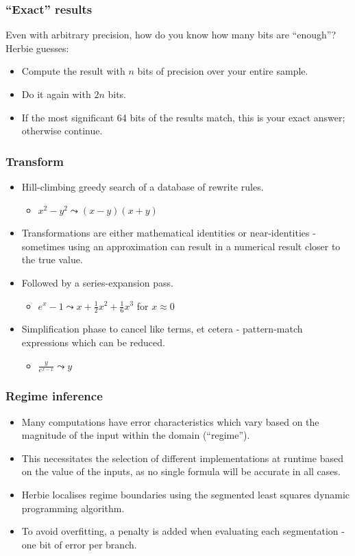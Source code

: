 \documentclass{beamer}
\begin{document}
\begin{frame}
  \frametitle{``Exact'' results}

  Even with arbitrary precision, how do you know how many bits are
  ``enough''? Herbie guesses:

  \begin{itemize}
    \item Compute the result with \(n\) bits of precision over your
      entire sample.
    \item Do it again with \(2n\) bits.
    \item If the most significant 64 bits of the results match, this
      is your exact answer; otherwise continue.
  \end{itemize}
\end{frame}

\begin{frame}
  \frametitle{Transform}
  \begin{itemize}
  \item Hill-climbing greedy search of a database of rewrite rules.
    \begin{itemize}
    \item \(x^2 - y^2 \leadsto (x - y)(x + y)\)
    \end{itemize}
  \item Transformations are either mathematical identities or
    near-identities - sometimes using an approximation can result in a
    numerical result closer to the true value.
  \item Followed by a series-expansion pass.
    \begin{itemize}
      \item \(e^x - 1 \leadsto x + \frac{1}{2}x^2 + \frac{1}{6}x^3\) for \(x \approx 0\)
    \end{itemize}
  \item Simplification phase to cancel like terms, et cetera -
    pattern-match expressions which can be reduced.
    \begin{itemize}
      \item \(\frac{y}{e^{x - x}} \leadsto y\)
    \end{itemize}
  \end{itemize}
\end{frame}

\begin{frame}
  \frametitle{Regime inference}
  \begin{itemize}
  \item Many computations have error characteristics which vary based
    on the magnitude of the input within the domain (``regime'').
  \item This necessitates the selection of different implementations
    at runtime based on the value of the inputs, as no single formula
    will be accurate in all cases.
  \item Herbie localises regime boundaries using the segmented least
    squares dynamic programming algorithm\cite{kleinberg2006}.
  \item To avoid overfitting, a penalty is added when evaluating each
    segmentation - one bit of error per branch.
  \end{itemize}
\end{frame}
\end{document}
